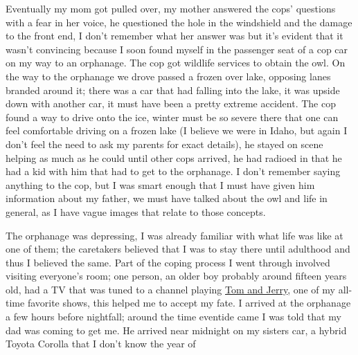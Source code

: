 \documentclass[12pt]{article}
\begin{document}
Eventually my mom got pulled over, my mother answered the cops' questions with a
fear in her voice, he questioned the hole in the windshield and the damage to
the front end, I don't remember what her answer was but it's evident that it
wasn't convincing because I soon found myself in the passenger seat of a cop car
on my way to an orphanage. The cop got wildlife services to obtain the owl. On
the way to the orphanage we drove passed a frozen over lake, opposing lanes
branded around it; there was a car that had falling into the lake, it was upside
down with another car, it must have been a pretty extreme accident. The cop
found a way to drive onto the ice, winter must be so severe there that one can
feel comfortable driving on a frozen lake (I believe we were in Idaho, but again
I don't feel the need to ask my parents for exact details), he stayed on scene
helping as much as he could until other cops arrived, he had radioed in that he
had a kid with him that had to get to the orphanage. I don't remember saying
anything to the cop, but I was smart enough that I must have given him
information about my father, we must have talked about the owl and life in
general, as I have vague images that relate to those concepts.

The orphanage was depressing, I was already familiar with what life was like at
one of them; the caretakers believed that I was to stay there until adulthood
and thus I believed the same. Part of the coping process I went through involved
visiting everyone's room; one person, an older boy probably around fifteen years
old, had a TV that was tuned to a channel playing
{\color{blue}\underline{\href{https://www.britannica.com/topic/Tom-and-Jerry}{Tom
and Jerry}}}, one of my all-time favorite shows, this helped me to accept my
fate. I arrived at the orphanage a few hours before nightfall; around the time
eventide came I was told that my dad was coming to get me. He arrived near
midnight on my sisters car, a hybrid Toyota Corolla that I don't know the year
of
\end{document}
